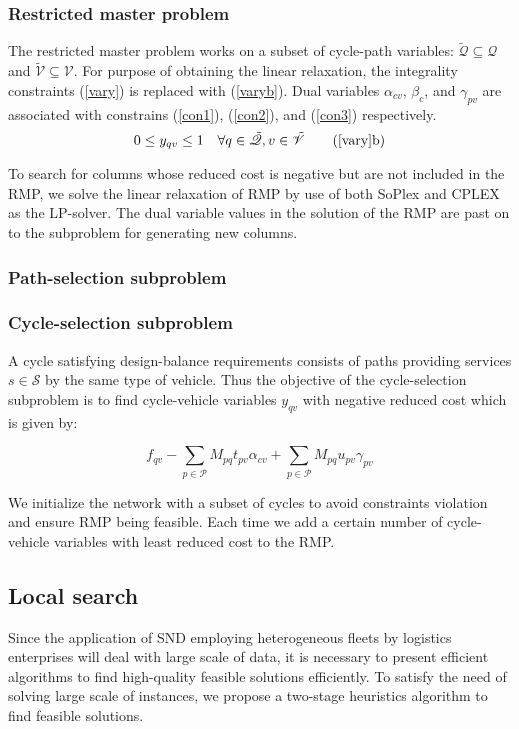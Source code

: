 \documentclass[11pt,nonblindrev,fleqn]{article}
\begin{document}
\subsubsection{Restricted master problem}
The restricted master problem works on a subset of cycle-path variables: $\tilde{\mathscr{Q}}\subseteq \mathscr{Q}$ and $\tilde{\mathscr{V}}\subseteq \mathscr{V}$. For purpose of obtaining the linear relaxation, the integrality constraints (\ref{vary}) is replaced with (\ref{varyb}). Dual variables $\alpha_{cv}$, $\beta_c$, and $\gamma_{pv}$ are associated with constrains (\ref{con1}), (\ref{con2}), and (\ref{con3}) respectively.
\begin{equation}\label{varyb}
0\leq y_{qv} \leq 1   \quad  \forall q\in\tilde{\mathscr{Q}}, v\in\tilde{\mathscr{V}} \tag{\ref{vary}b}
\end{equation}

To search for columns whose reduced cost is negative but are not included in the RMP, we solve the linear relaxation of RMP by use of both SoPlex and CPLEX as the LP-solver. The dual variable values in the solution of the RMP are past on to the subproblem for generating new columns.
\subsubsection{Path-selection subproblem}

\subsubsection{Cycle-selection subproblem}
A cycle satisfying design-balance requirements consists of paths providing services $s\in \mathscr{S}$ by the same type of vehicle. Thus the objective of the cycle-selection subproblem is to find cycle-vehicle variables $y_{qv}$ with negative reduced cost which is given by:

\begin{equation}\label{cost}
f_{qv} - \sum_{p\in \mathscr{P}} M_{pq}t_{pv}\alpha_{cv} + \sum_{p\in \mathscr{P}} M_{pq}u_{pv}\gamma_{pv}
\end{equation}

We initialize the network with a subset of cycles to avoid constraints violation and ensure RMP being feasible. Each time we add a certain number of cycle-vehicle variables with least reduced cost to the RMP.

\subsection{Local search}
Since the application of SND employing heterogeneous fleets by logistics enterprises will deal with large scale of data, it is necessary to present efficient algorithms to find high-quality feasible solutions efficiently. To satisfy the need of solving large scale of instances, we propose a two-stage heuristics algorithm to find feasible solutions.
\end{document}
